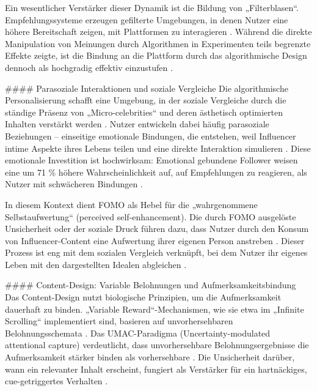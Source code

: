 \documentclass[11pt,a4paper]{article}
\begin{document}
Ein wesentlicher Verstärker dieser Dynamik ist die Bildung von „Filterblasen“. Empfehlungssysteme erzeugen gefilterte Umgebungen, in denen Nutzer eine höhere Bereitschaft zeigen, mit Plattformen zu interagieren \autocite{grey_grey_bbc8a51d8734471c850e8c2939fe8d32}. Während die direkte Manipulation von Meinungen durch Algorithmen in Experimenten teils begrenzte Effekte zeigte, ist die Bindung an die Plattform durch das algorithmische Design dennoch als hochgradig effektiv einzustufen \autocite{grey_grey_54e34d5df6ea4df2b6dbbe83e697dac1,grey_grey_bbc8a51d8734471c850e8c2939fe8d32}.

\#\#\#\# Parasoziale Interaktionen und soziale Vergleiche Die algorithmische Personalisierung schafft eine Umgebung, in der soziale Vergleiche durch die ständige Präsenz von „Micro-celebrities“ und deren ästhetisch optimierten Inhalten verstärkt werden \autocite{doaj_0001f707d4ab493dbcacb42e1990518e,doaj_11fd8100d4c74b18ab12a6bed2c1d2c0}. Nutzer entwickeln dabei häufig parasoziale Beziehungen – einseitige emotionale Bindungen, die entstehen, weil Influencer intime Aspekte ihres Lebens teilen und eine direkte Interaktion simulieren \autocite{grey_grey_5d5c282590c448fc8776b04f78a08de5}. Diese emotionale Investition ist hochwirksam: Emotional gebundene Follower weisen eine um 71 \% höhere Wahrscheinlichkeit auf, auf Empfehlungen zu reagieren, als Nutzer mit schwächeren Bindungen \autocite{grey_grey_5d5c282590c448fc8776b04f78a08de5}.

In diesem Kontext dient FOMO als Hebel für die „wahrgenommene Selbstaufwertung“ (perceived self-enhancement). Die durch FOMO ausgelöste Unsicherheit oder der soziale Druck führen dazu, dass Nutzer durch den Konsum von Influencer-Content eine Aufwertung ihrer eigenen Person anstreben \autocite{doaj_11fd8100d4c74b18ab12a6bed2c1d2c0}. Dieser Prozess ist eng mit dem sozialen Vergleich verknüpft, bei dem Nutzer ihr eigenes Leben mit den dargestellten Idealen abgleichen \autocite{doaj_11fd8100d4c74b18ab12a6bed2c1d2c0}.

\#\#\#\# Content-Design: Variable Belohnungen und Aufmerksamkeitsbindung Das Content-Design nutzt biologische Prinzipien, um die Aufmerksamkeit dauerhaft zu binden. „Variable Reward“-Mechanismen, wie sie etwa im „Infinite Scrolling“ implementiert sind, basieren auf unvorhersehbaren Belohnungsschemata \autocite{europepmc_42137086}. Das UMAC-Paradigma (Uncertainty-modulated attentional capture) verdeutlicht, dass unvorhersehbare Belohnungsergebnisse die Aufmerksamkeit stärker binden als vorhersehbare \autocite{europepmc_42137086}. Die Unsicherheit darüber, wann ein relevanter Inhalt erscheint, fungiert als Verstärker für ein hartnäckiges, cue-getriggertes Verhalten \autocite{europepmc_42137086}.
\end{document}
